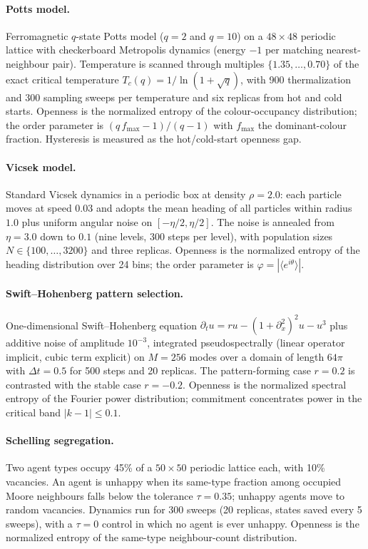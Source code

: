 \documentclass[11pt]{article}
\begin{document}
\paragraph{Potts model.}
Ferromagnetic $q$-state Potts model ($q=2$ and $q=10$) on a $48\times
48$ periodic lattice with checkerboard Metropolis dynamics (energy
$-1$ per matching nearest-neighbour pair). Temperature is scanned
through multiples $\{1.35,\dots,0.70\}$ of the exact critical
temperature $T_c(q)=1/\ln(1+\sqrt{q})$, with 900 thermalization and
300 sampling sweeps per temperature and six replicas from hot and
cold starts. Openness is the normalized entropy of the colour-occupancy
distribution; the order parameter is $(q\,f_{\max}-1)/(q-1)$ with
$f_{\max}$ the dominant-colour fraction. Hysteresis is measured as
the hot/cold-start openness gap.

\paragraph{Vicsek model.}
Standard Vicsek dynamics in a periodic box at density $\rho=2.0$:
each particle moves at speed $0.03$ and adopts the mean heading of
all particles within radius $1.0$ plus uniform angular noise on
$[-\eta/2,\eta/2]$. The noise is annealed from $\eta=3.0$ down to
$0.1$ (nine levels, 300 steps per level), with population sizes
$N\in\{100,\dots,3200\}$ and three replicas. Openness is the
normalized entropy of the heading distribution over 24 bins; the
order parameter is $\varphi=|\langle e^{i\theta}\rangle|$.

\paragraph{Swift--Hohenberg pattern selection.}
One-dimensional Swift--Hohenberg equation
$\partial_t u=ru-(1+\partial_x^2)^2u-u^3$ plus additive noise of
amplitude $10^{-3}$, integrated pseudospectrally (linear operator
implicit, cubic term explicit) on $M=256$ modes over a domain of
length $64\pi$ with $\Delta t=0.5$ for 500 steps and 20 replicas.
The pattern-forming case $r=0.2$ is contrasted with the stable case
$r=-0.2$. Openness is the normalized spectral entropy of the Fourier
power distribution; commitment concentrates power in the critical
band $|k-1|\leq 0.1$.

\paragraph{Schelling segregation.}
Two agent types occupy 45\% of a $50\times 50$ periodic lattice each,
with 10\% vacancies. An agent is unhappy when its same-type fraction
among occupied Moore neighbours falls below the tolerance
$\tau=0.35$; unhappy agents move to random vacancies. Dynamics run
for 300 sweeps (20 replicas, states saved every 5 sweeps), with a
$\tau=0$ control in which no agent is ever unhappy. Openness is the
normalized entropy of the same-type neighbour-count distribution.
\end{document}
